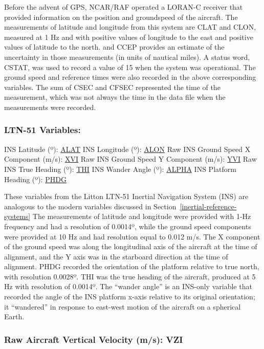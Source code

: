 \documentclass[
]{book}
\begin{document}
Before the advent of GPS, NCAR/RAF operated a LORAN-C receiver that provided information on the position and groundspeed of the aircraft. The measurements of latitude and longitude from this system are CLAT and CLON, measured at 1 Hz and with positive values of longitude to the east and positive values of latitude to the north. and CCEP provides an estimate of the uncertainty in those measurements (in units of nautical miles). A status word, CSTAT, was used to record a value of 15 when the system was operational. The ground speed and reference times were also recorded in the above corresponding variables. The sum of CSEC and CFSEC represented the time of the measurement, which was not always the time in the data file when the measurements were recorded.

\hypertarget{ltn51}{%
\subsubsection*{LTN-51 Variables:}\label{ltn51}}

INS Latitude ({º}): \uline{ALAT}
INS Longitude ({º}): \uline{ALON}
Raw INS Ground Speed X Component (m/s): \uline{XVI}
Raw INS Ground Speed Y Component (m/s): \uline{YVI}
Raw INS True Heading ({º}): \uline{THI}
INS Wander Angle ({º}): \uline{ALPHA}
INS Platform Heading ({º}): \uline{PHDG}

These variables from the Litton LTN-51 Inertial Navigation System (INS) are analogous to the modern variables discussed in Section~\ref{inertial-reference-systems} The measurements of latitude and longitude were provided with 1-Hz frequency and had a resolution of 0.0014{º}, while the ground speed components were provided at 10 Hz and had resolution equal to 0.012 m/s. The X component of the ground speed was along the longitudinal axis of the aircraft at the time of alignment, and the Y axis was in the starboard direction at the time of alignment. PHDG recorded the orientation of the platform relative to true north, with resolution 0.0028{º}. THI was the true heading of the aircraft, produced at 5 Hz with resolution of 0.0014{º}. The ``wander angle'' is an INS-only variable that recorded the angle of the INS platform x-axis relative to its original orientation; it ``wandered'' in response to east-west motion of the aircraft on a spherical Earth.

\hypertarget{vzi}{%
\subsubsection*{Raw Aircraft Vertical Velocity (m/s): VZI}\label{vzi}}
\end{document}
